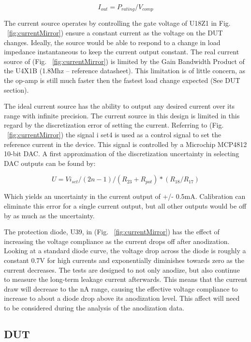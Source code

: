 \documentclass[journal]{IEEEtran}
\begin{document}
\begin{equation}
I_{out} = P_{rating} / V_{comp}
\end{equation}

The current source operates by controlling the gate voltage of U18Z1 in Fig. ~\ref{fig:currentMirror}) ensure a constant current as the voltage on the DUT changes. Ideally, the source would be able to respond to a change in load impedance instantaneous to keep the current output constant. The real current source of (Fig. ~\ref{fig:currentMirror}) is limited by the Gain Bandwidth Product of the U4X1B (1.8Mhz – reference datasheet). This limitation is of little concern, as the op-amp is still much faster then the fastest load change expected (See DUT section).

The ideal current source has the ability to output any desired current over its range with infinite precision. The current source in this design is limited in this regard by the discretization error of setting the current. Referring to (Fig. ~\ref{fig:currentMirror}) the signal i set4 is used as a control signal to set the reference current in the device. This signal is controlled by a Microchip MCP4812 10-bit DAC. A first approximation of the discretization uncertainty in selecting DAC outputs can be found by:


\begin{equation}
U = Vi_{set} /(2n-1) / (R_{23} + R_{pot}) *(R_{18}/R_{17})
\end{equation}


Which yields an uncertainty in the current output of +/- 0.5mA. Calibration can eliminate this error for a single current output, but all other outputs would be off by as much as the uncertainty.

The protection diode, U39, in (Fig. ~\ref{fig:currentMirror}) has the effect of increasing the voltage compliance as the current drops off after anodization. Looking at a standard diode curve, the voltage drop across the diode is roughly a constant 0.7V for high currents and exponentially diminishes towards zero as the current decreases. The tests are designed to not only anodize, but also continue to measure the long-term leakage current afterwards. This means that the current draw will decrease to the nA range, causing the effective voltage compliance to increase to about a diode drop above its anodization level. This affect will need to be considered during the analysis of the anodization data.

\subsection{DUT}
\end{document}
